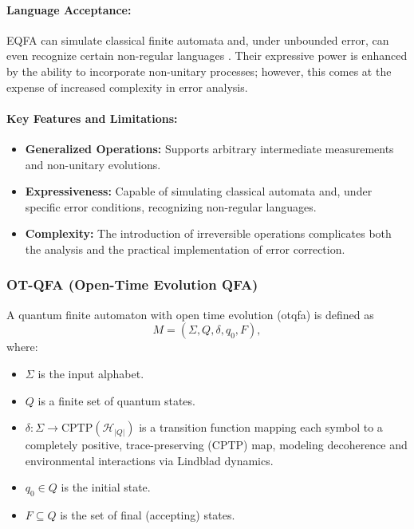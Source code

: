 \paragraph{Language Acceptance:}  
EQFA can simulate classical finite automata and, under unbounded error, can even recognize certain non-regular languages \cite{nayak1999optimal}. Their expressive power is enhanced by the ability to incorporate non-unitary processes; however, this comes at the expense of increased complexity in error analysis.

\paragraph{Key Features and Limitations:}
\begin{itemize}
    \item \textbf{Generalized Operations:} Supports arbitrary intermediate measurements and non-unitary evolutions.
    \item \textbf{Expressiveness:} Capable of simulating classical automata and, under specific error conditions, recognizing non-regular languages.
    \item \textbf{Complexity:} The introduction of irreversible operations complicates both the analysis and the practical implementation of error correction.
\end{itemize}

\subsubsection{OT-QFA (Open-Time Evolution QFA)}
\label{sssec:ot-qfa}
\begin{definition}[OT-QFA]
A quantum finite automaton with open time evolution (\gls{otqfa}) is defined as 
\[
M = (\Sigma, Q, \delta, q_0, F),
\]
where:
\begin{itemize}
    \item \( \Sigma \) is the input alphabet.
    \item \( Q \) is a finite set of quantum states.
    \item \( \delta: \Sigma \to \text{CPTP}(\mathcal{H}_{|Q|}) \) is a transition function mapping each symbol to a completely positive, trace-preserving (CPTP) map, modeling decoherence and environmental interactions via Lindblad dynamics.
    \item \( q_0 \in Q \) is the initial state.
    \item \( F \subseteq Q \) is the set of final (accepting) states.
\end{itemize}
\end{definition}

